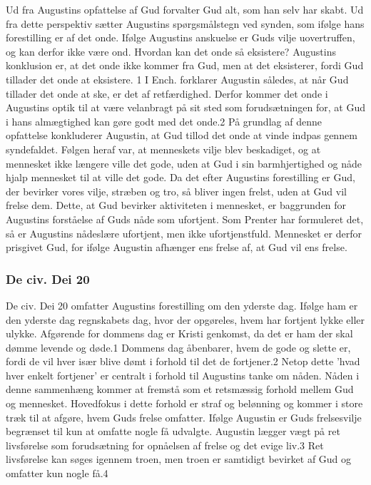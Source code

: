 Ud fra Augustins opfattelse af Gud forvalter Gud alt, som han selv har skabt. Ud fra dette perspektiv sætter Augustins spørgsmålstegn ved synden, som ifølge hans forestilling er af det onde. Ifølge Augustins anskuelse er Guds vilje uovertruffen, og kan derfor ikke være ond.  Hvordan kan det onde så eksistere? Augustins konklusion er, at det onde ikke kommer fra Gud, men at det eksisterer, fordi Gud tillader det onde at eksistere. 1 I Ench. forklarer Augustin således, at når Gud tillader det onde at ske, er det af retfærdighed. Derfor kommer det onde i Augustins optik til at være velanbragt på sit sted som forudsætningen for, at Gud i hans almægtighed kan gøre godt med det onde.2 På grundlag af denne opfattelse konkluderer Augustin, at Gud tillod det onde at vinde indpas gennem syndefaldet. Følgen heraf var, at menneskets vilje blev beskadiget, og at mennesket ikke længere ville det gode, uden at Gud i sin barmhjertighed og nåde hjalp mennesket til at ville det gode. Da det efter Augustins forestilling er Gud, der bevirker vores vilje, stræben og tro, så bliver ingen frelst, uden at Gud vil frelse dem. Dette, at Gud bevirker aktiviteten i mennesket, er baggrunden for Augustins forståelse af Guds nåde som ufortjent. Som Prenter har formuleret det, så er Augustins nådeslære ufortjent, men ikke ufortjenstfuld. Mennesket er derfor prisgivet Gud, for ifølge Augustin afhænger ens frelse af, at Gud vil ens frelse.

\subsubsection{De civ. Dei 20}
De civ. Dei 20 omfatter Augustins forestilling om den yderste dag. Ifølge ham er den yderste dag regnskabets dag, hvor der opgøreles, hvem har fortjent lykke eller ulykke. Afgørende for dommens dag er Kristi genkomst, da det er ham der skal dømme levende og døde.1 Dommens dag åbenbarer, hvem de gode og slette er, fordi de vil hver især blive dømt i forhold til det de fortjener.2 Netop dette ’hvad hver enkelt fortjener’ er centralt i forhold til Augustins tanke om nåden. Nåden i denne sammenhæng kommer at fremstå som et retsmæssig forhold mellem Gud og mennesket. Hovedfokus i dette forhold er straf og belønning og kommer i store træk til at afgøre, hvem Guds frelse omfatter. Ifølge Augustin er Guds frelsesvilje begrænset til kun at omfatte nogle få udvalgte. Augustin lægger vægt på ret livsførelse som forudsætning for opnåelsen af frelse og det evige liv.3 Ret livsførelse kan søges igennem troen, men troen er samtidigt bevirket af Gud og omfatter kun nogle få.4

